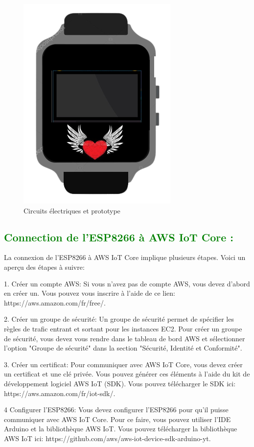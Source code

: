 \begin{flushleft}
\begin{figure}[h]
		\includegraphics{chapitres/images/SmartWath.PNG}
		\caption{Circuits électriques et prototype}
		\label{fig:labelname}
	\end{figure}
\newpage
	\subsection{\textcolor{green}{Connection de l'ESP8266 à AWS IoT Core :}}
	La connexion de l'ESP8266 à AWS IoT Core implique plusieurs étapes. Voici un aperçu des étapes à suivre:
	
	1. Créer un compte AWS: Si vous n'avez pas de compte AWS, vous devez d'abord en créer un. Vous pouvez vous inscrire à l'aide de ce lien: https://aws.amazon.com/fr/free/.
	
	2. Créer un groupe de sécurité: Un groupe de sécurité permet de spécifier les règles de trafic entrant et sortant pour les instances EC2. Pour créer un groupe de sécurité, vous devez vous rendre dans le tableau de bord AWS et sélectionner l'option "Groupe de sécurité" dans la section "Sécurité, Identité et Conformité".
	
	3. Créer un certificat: Pour communiquer avec AWS IoT Core, vous devez créer un certificat et une clé privée. Vous pouvez générer ces éléments à l'aide du kit de développement logiciel AWS IoT (SDK). Vous pouvez télécharger le SDK ici: https://aws.amazon.com/fr/iot-sdk/.
	
	4 Configurer l'ESP8266: Vous devez configurer l'ESP8266 pour qu'il puisse communiquer avec AWS IoT Core. Pour ce faire, vous pouvez utiliser l'IDE Arduino et la bibliothèque AWS IoT. Vous pouvez télécharger la bibliothèque AWS IoT ici: https://github.com/aws/aws-iot-device-sdk-arduino-yt.
	

\end{flushleft}
